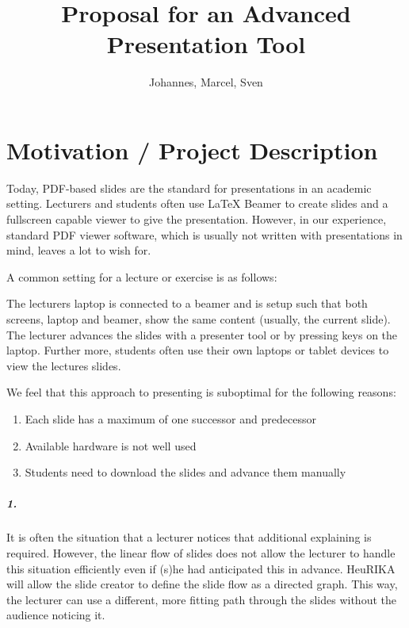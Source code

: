 \documentclass[a4paper,11pt,notitlepage]{scrreprt}
\title{Proposal for an Advanced Presentation Tool}
\author{Johannes, Marcel, Sven}
\begin{document}
\maketitle

\chapter{Motivation / Project Description}
\label{chap:intro}
Today, PDF-based slides are the standard for presentations in an academic setting. Lecturers and students often use LaTeX Beamer to create slides and a fullscreen capable viewer to give the presentation. However, in our experience, standard PDF viewer software, which is usually not written with presentations in mind, leaves a lot to wish for.

A common setting for a lecture or exercise is as follows:

\noindent The lecturers laptop is connected to a beamer and is setup such that both screens, laptop and beamer, show the same content (usually, the current slide). The lecturer advances the slides with a presenter tool or by pressing keys on the laptop. Further more, students often use their own laptops or tablet devices to view the lectures slides.

We feel that this approach to presenting is suboptimal for the following reasons:
\begin{enumerate}
	\item Each slide has a maximum of one successor and predecessor
	\item Available hardware is not well used
	\item Students need to download the slides and advance them manually
\end{enumerate}

\paragraph{1.} It is often the situation that a lecturer notices that additional explaining is required. However, the linear flow of slides does not allow the lecturer to handle this situation efficiently even if (s)he had anticipated this in advance. HeuRIKA will allow the slide creator to define the slide flow as a directed graph. This way, the lecturer can use a different, more fitting path through the slides without the audience noticing it.
\end{document}
